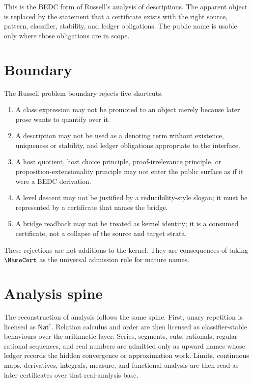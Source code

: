 This is the BEDC form of Russell's analysis of descriptions. The apparent object is replaced by the statement that a certificate exists with the right source, pattern, classifier, stability, and ledger obligations. The public name is usable only where those obligations are in scope.

\section{Boundary}
\label{sec:russell-problem-boundary}

The Russell problem boundary rejects five shortcuts.

\begin{enumerate}
  \item A class expression may not be promoted to an object merely because later prose wants to quantify over it.
  \item A description may not be used as a denoting term without existence, uniqueness or stability, and ledger obligations appropriate to the interface.
  \item A host quotient, host choice principle, proof-irrelevance principle, or proposition-extensionality principle may not enter the public surface as if it were a BEDC derivation.
  \item A level descent may not be justified by a reducibility-style slogan; it must be represented by a certificate that names the bridge.
  \item A bridge readback may not be treated as kernel identity; it is a consumed certificate, not a collapse of the source and target strata.
\end{enumerate}

These rejections are not additions to the kernel. They are consequences of taking $\NameCert$ as the universal admission rule for mature names.

\section{Analysis spine}
\label{sec:russell-problem-analysis-spine}

The reconstruction of analysis follows the same spine. First, unary repetition is licensed as $\mathsf{Nat}^{\uparrow}$. Relation calculus and order are then licensed as classifier-stable behaviours over the arithmetic layer. Series, segments, cuts, rationals, regular rational sequences, and real numbers are admitted only as upward names whose ledger records the hidden convergence or approximation work. Limits, continuous maps, derivatives, integrals, measure, and functional analysis are then read as later certificates over that real-analysis base.

